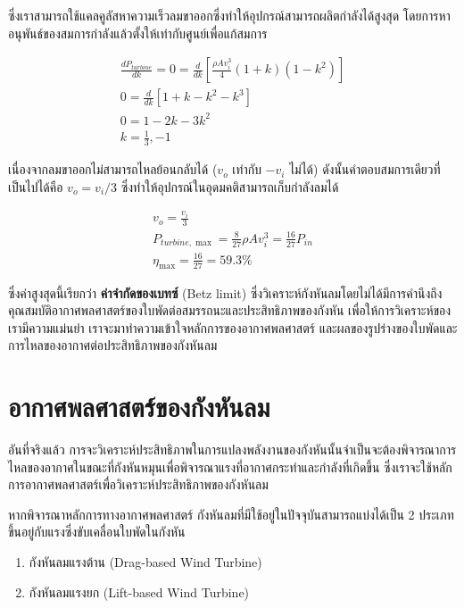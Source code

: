 \documentclass[a4paper,nobib,openany,10pt]{tufte-book}
\begin{document}
ซึ่งเราสามารถใช้แคลคูลัสหาความเร็วลมขาออกซึ่งทำให้อุปกรณ์สามารถผลิตกำลังได้สูงสุด
โดยการหาอนุพันธ์ของสมการกำลังแล้วตั้งให้เท่ากับศูนย์เพื่อแก้สมการ

\begin{gather*}
  \frac{dP_{turbine}}{dk} = 0 = \frac{d}{dk} \left[ \frac{\rho A v_i^3}{4} \left( 1 + k \right) \left( 1 - k^2 \right) \right] \\
  0 = \frac{d}{dk} \left[ 1 + k - k^2 - k^3 \right] \\
  0 = 1 - 2k - 3k^2 \\
  k = \frac{1}{3}, -1
\end{gather*}

เนื่องจากลมขาออกไม่สามารถไหลย้อนกลับได้ (\(v_o\) เท่ากับ \(-v_i\)
ไม่ได้) ดังนั้นคำตอบสมการเดียวที่เป็นไปได้คือ \(v_o = v_i /3\)
ซึ่งทำให้อุปกรณ์ในอุดมคติสามารถเก็บกำลังลมได้

\begin{gather*}
  v_o = \frac{v_i}{3} \\
  P_{turbine, \max} = \frac{8}{27} \rho A v_i^3 = \frac{16}{27} P_{in} \\
  \eta_{\max} = \frac{16}{27} = 59.3\%
\end{gather*}

ซึ่งค่าสูงสุดนี้เรียกว่า \textbf{ค่าจำกัดของเบทซ์} (Betz limit) ซึ่งวิเคราะห์กังหันลมโดยไม่ได้มีการคำนึงถึงคุณสมบัติอากาศพลศาสตร์ของใบพัดต่อสมรรถนะและประสิทธิภาพของกังหัน เพื่อให้การวิเคราะห์ของเรามีความแม่นยำ เราจะมาทำความเข้าใจหลักการของอากาศพลศาสตร์ และผลของรูปร่างของใบพัดและการไหลของอากาศต่อประสิทธิภาพของกังหันลม

\section{อากาศพลศาสตร์ของกังหันลม}
\label{sec:org16b6fff}
อันที่จริงแล้ว การจะวิเคราะห์ประสิทธิภาพในการแปลงพลังงานของกังหันนั้นจำเป็นจะต้องพิจารณาการไหลของอากาศในขณะที่กังหันหมุนเพื่อพิจารณาแรงที่อากาศกระทำและกำลังที่เกิดขึ้น ซึ่งเราจะใช้หลักการอากาศพลศาสตร์เพื่อวิเคราะห์ประสิทธิภาพของกังหันลม

หากพิจารณาหลักการทางอากาศพลศาสตร์ กังหันลมที่มีใช้อยู่ในปัจจุบันสามารถแบ่งได้เป็น 2 ประเภทขึ้นอยู่กับแรงซึ่งขับเคลื่อนใบพัดในกังหัน

\begin{enumerate}
\item กังหันลมแรงต้าน (Drag-based Wind Turbine)

\item กังหันลมแรงยก (Lift-based Wind Turbine)
\end{enumerate}
\end{document}
